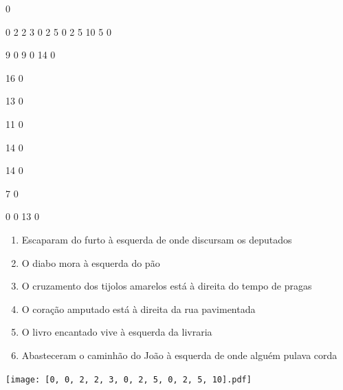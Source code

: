 \documentclass[12pt]{article}
\begin{document}
		\vfill  
		  
{
	0	%

	0	%
	2	%
	2	%
	3	%
	0	%
	2	%
	5	%
	0	%
	2	%
	5	%
	10	%
	5	%
	0	%

	9	%
	0	%
	9	%
	0	%
	14	%
	0	%

	16	%
	0	%

	13	%
	0	%

	11	%
	0	%

	14	%
	0	%

	14	%
	0	%

	7	%
	0	%

	0	%
	0	%
	13	%
	0	%

}	  
		    	

		 

\pagebreak


	\begin{enumerate}
		  \sffamily %
		  \large %


\vfill \item
Escaparam do furto	%
à esquerda
de onde discursam os deputados	%

\vfill \item
O diabo mora	%
à esquerda
do pão	%

\vfill \item
O cruzamento dos tijolos amarelos está	%
à direita
do tempo de pragas	%

\vfill \item
O coração amputado está	%
à direita
da rua pavimentada	%

\vfill \item
O livro encantado vive	%
à esquerda
da livraria	%

\vfill \item
Abasteceram o caminhão do João	%
à esquerda
de onde alguém pulava corda	%
	\end{enumerate}
		  
		  \hfill

		  \vfill

\texttt{[image: [0, 0, 2, 2, 3, 0, 2, 5, 0, 2, 5, 10].pdf]}


	\hfill	  	  
\end{document}
